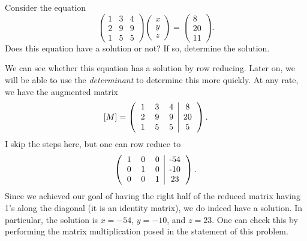 \documentclass[12pt]{article} %
\begin{document}
\newpage
\begin{problem}
Consider the equation
\[
\begin{pmatrix} 1 & 3 & 4 \\ 2 & 9 & 9 \\ 1 & 5 & 5 \end{pmatrix} \begin{pmatrix} x \\ y \\ z \end{pmatrix} = \begin{pmatrix} 8 \\ 20 \\ 11 \end{pmatrix}.
\]
Does this equation have a solution or not? If so, determine the solution.
\end{problem}
\begin{solution}
    We can see whether this equation has a solution by row reducing.  Later on, we will be able to use the \emph{determinant} to determine this more quickly.  At any rate, we have the augmented matrix
    \[
        [M] = \left( \begin{tabular}{c c c | c} 
                1 & 3 & 4 & 8\\
                2 & 9 & 9 & 20\\
                1 & 5 & 5 & 5
                \end{tabular} \right).
    \]
    I skip the steps here, but one can row reduce to
    \[
\left( \begin{tabular}{c c c | c} 
                1 & 0 & 0 & -54\\
                0 & 1 & 0 & -10\\
                0 & 0 & 1 & 23
                \end{tabular} \right).
    \]
    Since we achieved our goal of having the right half of the reduced matrix having 1's along the diagonal (it is an identity matrix), we do indeed have a solution. In particular, the solution is $x=-54$, $y=-10$, and $z=23$.  One can check this by performing the matrix multiplication posed in the statement of this problem.
\end{solution}
\end{document}
